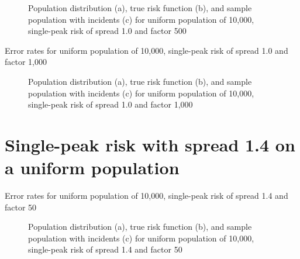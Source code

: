 \begin{figure}[H]
    
    \caption[]{Population distribution (a), true risk function (b), and sample population with incidents (c) for uniform population of 10,000, single-peak risk of \gls{spread} 1.0 and \gls{factor} 500}
    \label{fig:distributions:unif_500_1.0_1h}    
\end{figure}



\begin{table}[H]

\caption[]{Error rates for uniform population of 10,000, single-peak risk of \gls{spread} 1.0 and \gls{factor} 1,000}
\label{tab:mean_error_rates:unif_1000_1.0_1h}
\end{table}

\begin{figure}[H]
    
    \caption[]{Population distribution (a), true risk function (b), and sample population with incidents (c) for uniform population of 10,000, single-peak risk of \gls{spread} 1.0 and \gls{factor} 1,000}
    \label{fig:distributions:unif_1000_1.0_1h}    
\end{figure}

 
\section{Single-peak risk with spread 1.4 on a uniform population}
\label{sec:app:results_unif_1.4_1h}


\begin{table}[H]
    
    \caption[]{Error rates for uniform population of 10,000, single-peak risk of \gls{spread} 1.4 and \gls{factor} 50}
    \label{tab:mean_error_rates:unif_50_1.4_1h}
\end{table}

\begin{figure}[H]
    
    \caption[]{Population distribution (a), true risk function (b), and sample population with incidents (c) for uniform population of 10,000, single-peak risk of \gls{spread} 1.4 and \gls{factor} 50}
    \label{fig:distributions:unif_50_1.4_1h}    
\end{figure}


